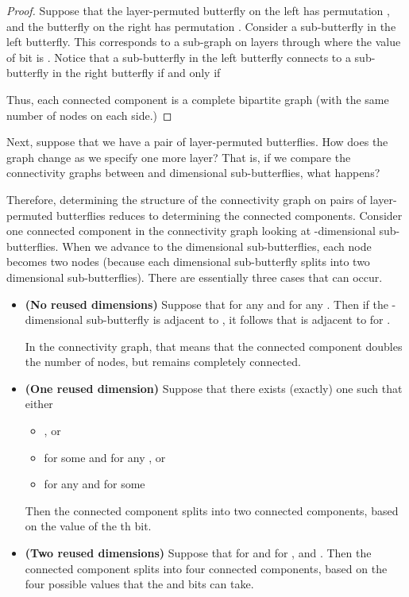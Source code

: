 \documentclass[12pt]{article}
\begin{document}
\begin{proof}
Suppose that the layer-permuted butterfly on the left has permutation
, and the butterfly on the right has permutation .
Consider a sub-butterfly  in the left butterfly.  This corresponds to 
a sub-graph on layers  through  where the value of bit  
is .  Notice that a sub-butterfly  in the left butterfly 
connects to 
a  sub-butterfly  in the right butterfly if and only if

Thus, each connected 
component is a complete bipartite graph (with the same
number of nodes on each side.)
\end{proof}

Next, suppose that we have a pair of layer-permuted butterflies.  
How does the graph change as we specify one more
layer?  That is, if we compare the connectivity graphs between  
and  dimensional sub-butterflies, what happens?  


Therefore, determining the structure of the connectivity graph on pairs
of layer-permuted butterflies reduces to determining the connected components.
Consider one connected component in the connectivity graph looking at
-dimensional sub-butterflies.  When we advance to the 
 dimensional sub-butterflies, each node becomes two nodes (because each
 dimensional sub-butterfly splits into two  dimensional 
sub-butterflies).  There are  essentially three cases that can occur.
\begin{itemize} \label{three cases}
\item \textbf{(No reused dimensions)}
Suppose that 
 for any  and
 for any .
Then if the -dimensional sub-butterfly  is adjacent
to , it follows that  is adjacent to 
 for .  

In the connectivity graph, that means that the connected component doubles
the number of nodes, but remains completely connected.
\item \textbf{(One reused dimension)}
Suppose that there exists (exactly) one  such that either 
\begin{itemize}
\item
, or
\item
 for some  and
 for any , or
\item
 for any  and
 for some 
\end{itemize}
Then the connected component splits into two connected components,
based on the value of the th bit.
\item  \textbf{(Two reused dimensions)}
Suppose that  for  and
 for , and .
Then the connected component splits into four connected components, based
on the four possible values that the  and  bits can take.
\end{itemize}
\end{document}
